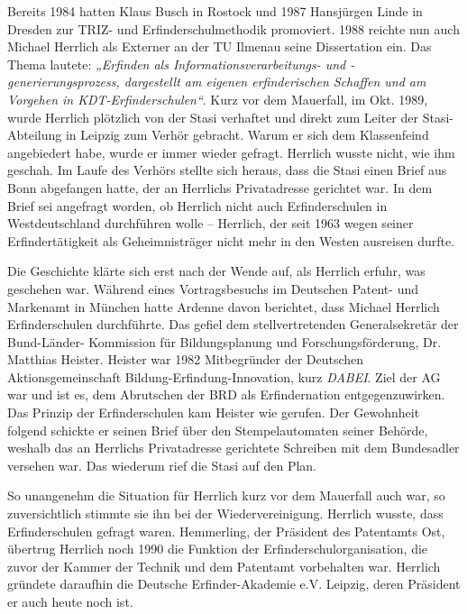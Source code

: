 \documentclass[11pt,a4paper]{article}
\begin{document}
Bereits 1984 hatten Klaus Busch in Rostock und 1987 Hansjürgen Linde in
Dresden zur TRIZ- und Erfinderschulmethodik promoviert. 1988 reichte nun auch
Michael Herrlich als Externer an der TU Ilmenau seine Dissertation ein. Das
Thema lautete: \emph{„Erfinden als Informationsverar\-beitungs- und
  -generierungsprozess, dargestellt am eigenen erfinderischen Schaffen und am
  Vorgehen in KDT-Erfinderschulen“}. Kurz vor dem Mauerfall, im Okt. 1989,
wurde Herrlich plötzlich von der Stasi verhaftet und direkt zum Leiter der
Stasi-Abteilung in Leipzig zum Verhör gebracht. Warum er sich dem Klassenfeind
angebiedert habe, wurde er immer wieder gefragt. Herrlich wusste nicht, wie
ihm geschah. Im Laufe des Verhörs stellte sich heraus, dass die Stasi einen
Brief aus Bonn abgefangen hatte, der an Herrlichs Privatadresse gerichtet
war. In dem Brief sei angefragt worden, ob Herrlich nicht auch Erfinderschulen
in Westdeutschland durchführen wolle – Herrlich, der seit 1963 wegen seiner
Erfindertätigkeit als Geheimnisträger nicht mehr in den Westen ausreisen
durfte.

Die Geschichte klärte sich erst nach der Wende auf, als Herrlich erfuhr, was
geschehen war. Während eines Vortragsbesuchs im Deutschen Patent- und
Markenamt in München hatte Ardenne davon berichtet, dass Michael Herrlich
Erfinderschulen durchführte. Das gefiel dem stellvertretenden Generalsekretär
der Bund-Länder- Kommission für Bildungsplanung und Forschungsförderung,
Dr. Matthias Heister. Heister war 1982 Mitbegründer der Deutschen
Aktionsgemeinschaft Bildung-Erfindung-Innovation, kurz \emph{DABEI}. Ziel der
AG war und ist es, dem Abrutschen der BRD als Erfindernation
entgegenzuwirken. Das Prinzip der Erfinderschulen kam Heister wie gerufen. Der
Gewohnheit folgend schickte er seinen Brief über den Stempelautomaten seiner
Behörde, weshalb das an Herrlichs Privatadresse gerichtete Schreiben mit dem
Bundesadler versehen war. Das wiederum rief die Stasi auf den Plan.

So unangenehm die Situation für Herrlich kurz vor dem Mauerfall auch war, so
zuversichtlich stimmte sie ihn bei der Wiedervereinigung. Herrlich wusste,
dass Erfinderschulen gefragt waren. Hemmerling, der Präsident des Patentamts
Ost, übertrug Herrlich noch 1990 die Funktion der Erfinderschulorganisation,
die zuvor der Kammer der Technik und dem Patentamt vorbehalten war. Herrlich
gründete daraufhin die Deutsche Erfinder-Akademie e.V. Leipzig, deren
Präsident er auch heute noch ist.
\end{document}
